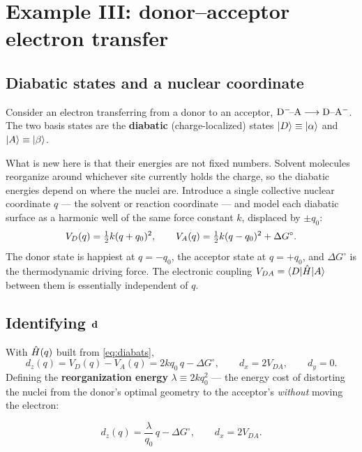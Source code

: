 \section{Example III: donor--acceptor electron transfer}
\label{sec:et}

\subsection{Diabatic states and a nuclear coordinate}

Consider an electron transferring from a donor to an acceptor,
$\mathrm{D}^{-}\!\text{--}\mathrm{A} \longrightarrow \mathrm{D}\text{--}\mathrm{A}^{-}$. The two basis states are the \textbf{diabatic}
(charge-localized) states $\ket{D}\equiv\ket{\alpha}$ and $\ket{A}\equiv\ket{\beta}$.

What is new here is that their energies are not fixed numbers. Solvent molecules
reorganize around whichever site currently holds the charge, so the diabatic energies
depend on where the nuclei are. Introduce a single collective nuclear coordinate $q$ ---
the solvent or reaction coordinate --- and model each diabatic surface as a harmonic
well of the same force constant $k$, displaced by $\pm q_0$:
%
\begin{equation}
V_D(q) = \tfrac{1}{2} k(q+q_0)^2,
\qquad
V_A(q) = \tfrac{1}{2} k(q-q_0)^2 + \Delta G^{\circ}.
\label{eq:diabats}
\end{equation}
%
The donor state is happiest at $q=-q_0$, the acceptor state at $q=+q_0$, and
$\Delta G^\circ$ is the thermodynamic driving force. The electronic coupling
$V_{DA} = \braket{D|\hat{H}|A}$ between them is essentially independent of $q$.

\subsection{Identifying $\mathbf{d}$}

With $\hat{H}(q)$ built from \cref{eq:diabats},
%
\begin{equation}
d_z(q) = V_D(q)-V_A(q) = 2kq_0\,q - \Delta G^\circ,
\qquad
d_x = 2V_{DA},
\qquad d_y = 0.
\end{equation}
%
Defining the \textbf{reorganization energy} $\lambda \equiv 2kq_0^2$ --- the energy cost
of distorting the nuclei from the donor's optimal geometry to the acceptor's
\emph{without} moving the electron:

\begin{keyresult}
\vspace{-0.35cm}
\begin{equation}
d_z(q) = \frac{\lambda}{q_0}\,q - \Delta G^\circ,
\qquad
d_x = 2V_{DA}.
\label{eq:et-d}
\end{equation}
\end{keyresult}

